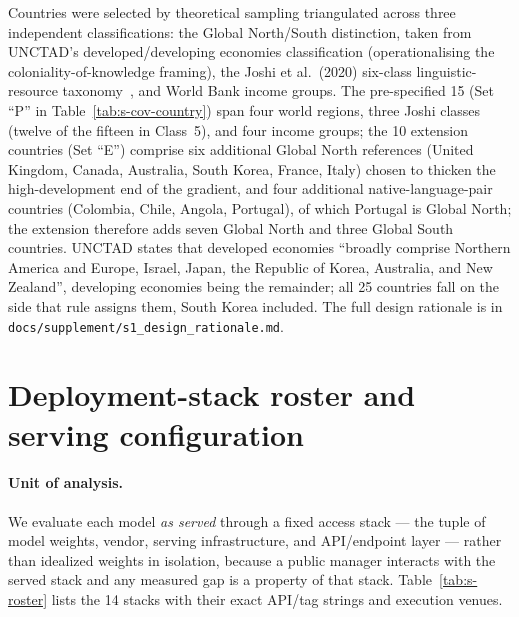\documentclass[11pt,a4paper]{article}
\begin{document}
Countries were selected by theoretical sampling triangulated across three
independent classifications: the Global North/South distinction, taken from
UNCTAD's developed/developing economies classification
(operationalising the coloniality-of-knowledge framing), the Joshi et al.\ (2020)
six-class linguistic-resource taxonomy~\citep{joshi2020state}, and World Bank
income groups. The pre-specified 15 (Set ``P'' in Table~\ref{tab:s-cov-country})
span four world regions, three Joshi classes (twelve of the fifteen in Class~5), and four income groups; the 10
extension countries (Set ``E'') comprise six additional Global North references
(United Kingdom, Canada, Australia, South Korea, France, Italy) chosen to thicken
the high-development end of the gradient, and four additional native-language-pair
countries (Colombia, Chile, Angola, Portugal), of which Portugal is Global North;
the extension therefore adds seven Global North and three Global South countries. UNCTAD states that
developed economies ``broadly comprise Northern America and Europe, Israel, Japan,
the Republic of Korea, Australia, and New Zealand'', developing economies being the
remainder; all 25 countries fall on the side that rule assigns them, South Korea
included. The full design rationale is in
\texttt{docs/supplement/s1\_design\_rationale.md}.

\section{Deployment-stack roster and serving configuration}

\paragraph{Unit of analysis.} We evaluate each model \emph{as served} through a
fixed access stack --- the tuple of model weights, vendor, serving infrastructure,
and API/endpoint layer --- rather than idealized weights in isolation, because a
public manager interacts with the served stack and any measured gap is a property
of that stack. Table~\ref{tab:s-roster} lists the 14 stacks with their exact
API/tag strings and execution venues.


\end{document}
